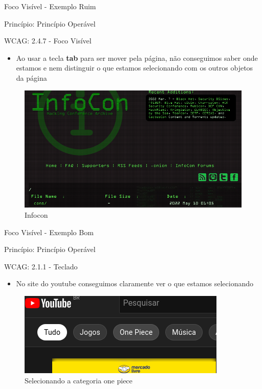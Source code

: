 \documentclass{beamer}
\begin{document}
\begin{frame}{Foco Visível - Exemplo Ruim}

Princípio: Princípio Operável

WCAG: 2.4.7 - Foco Visível

\begin{itemize}
	\item Ao usar a tecla \textbf{tab} para ser mover pela página, não conseguimos saber onde estamos e nem distinguir o que estamos selecionando com os outros objetos da página
\end{itemize}
\begin{figure}
    \centering
    \includegraphics[scale=0.2]{images/no_focus.png}
    \caption{Infocon}
\end{figure}

\end{frame}
\begin{frame}{Foco Visível - Exemplo Bom}

Princípio: Princípio Operável

WCAG: 2.1.1 - Teclado

\begin{itemize}
	\item No site do youtube conseguimos claramente ver o que estamos selecionando
\end{itemize}
\begin{figure}
    \centering
    \includegraphics[scale=0.6]{images/focus.png}
    \caption{Selecionando a categoria one piece}
\end{figure}

\end{frame}
\end{document}
